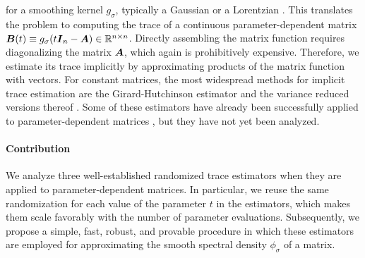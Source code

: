 \documentclass[12pt]{article}
\begin{document}
for a smoothing kernel $g_{\sigma}$, typically a Gaussian \cite{lin-2016-approximating-spectral, lin-2017-randomized-estimation} or a Lorentzian \cite{haydock-1972-electronic-structure, lin-2016-approximating-spectral}. This translates the problem to computing the trace of a continuous parameter-dependent matrix $\boldsymbol{B}(t) \equiv g_{\sigma}(t \boldsymbol{I}_n - \boldsymbol{A}) \in \mathbb{R}^{n \times n}$. Directly assembling the matrix function requires diagonalizing the matrix $\boldsymbol{A}$, which again is prohibitively expensive. Therefore, we estimate its trace implicitly by approximating products of the matrix function with vectors. For constant matrices, the most widespread methods for implicit trace estimation are the Girard-Hutchinson estimator \cite{girard-1989-fast-montecarlo, hutchinson-1990-stochastic-estimator} and the variance reduced versions thereof \cite{gambhir-2017-deflation-method, saibaba-2017-randomized-matrixfree, lin-2017-randomized-estimation, meyer-2021-hutch-optimal, persson-2022-improved-variants, epperly-2024-xtrace-making, chen-2023-krylovaware-stochastic}. Some of these estimators have already been successfully applied to parameter-dependent matrices \cite{lin-2017-randomized-estimation}, but they have not yet been analyzed. 

\paragraph{Contribution}
We analyze three well-established randomized trace estimators when they are applied to parameter-dependent matrices. In particular, we reuse the same randomization for each value of the parameter $t$ in the estimators, which makes them scale favorably with the number of parameter evaluations. Subsequently, we propose a simple, fast, robust, and provable procedure in which these estimators are employed for approximating the smooth spectral density $\phi_{\sigma}$ of a matrix.
\end{document}
